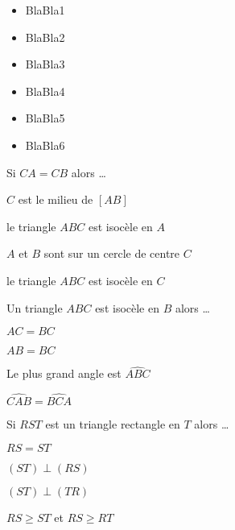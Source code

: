 \begin{acquis}
\begin{itemize}
\item BlaBla1
\item BlaBla2
\item BlaBla3
\item BlaBla4
\item BlaBla5
\item BlaBla6
\end{itemize}
\end{acquis}

  
\begin{QCM}
  \begin{GroupeQCM} 
    \begin{exercice}
      Si $CA = CB$ alors \ldots
      \begin{ChoixQCM}{4}
      \item $C$ est le milieu de $[AB]$
      \item le triangle $ABC$ est isocèle en $A$
      \item $A$ et $B$ sont sur un cercle de centre $C$
      \item le triangle $ABC$ est isocèle en $C$
      \end{ChoixQCM}
\begin{corrige}
   \end{corrige}
    \end{exercice}
    

    \begin{exercice}
      Un triangle $ABC$ est isocèle en $B$ alors \ldots
      \begin{ChoixQCM}{4}
      \item $AC = BC$
      \item $AB = BC$
      \item Le plus grand angle est $\widehat{ABC}$
      \item $\widehat{CAB} = \widehat{BCA}$
      \end{ChoixQCM}
\begin{corrige}
   \end{corrige}
    \end{exercice}


    \begin{exercice}
      Si $RST$ est un triangle rectangle en $T$ alors \ldots
      \begin{ChoixQCM}{4}
      \item $RS = ST$
      \item $(ST) \perp (RS)$
      \item $(ST) \perp (TR)$
      \item $RS \geqslant ST$ et $RS \geqslant RT$
      \end{ChoixQCM}
\begin{corrige}
   \end{corrige}
    \end{exercice}
    


\end{GroupeQCM}
\end{QCM}
